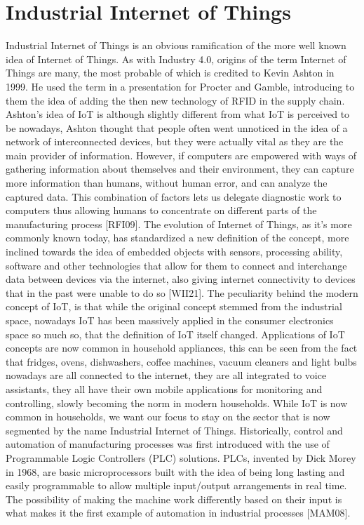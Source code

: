 \documentclass[a4paper, 12pt]{book}
\begin{document}
\section{Industrial Internet of Things}
Industrial Internet of Things is an obvious ramification of the more well known idea of Internet of Things. As with Industry 4.0, origins of the term Internet of Things are many, the most probable of which is credited to Kevin Ashton in 1999. He used the term in a presentation for Procter and Gamble, introducing to them the idea of adding the then new technology of RFID in the supply chain. Ashton’s idea of IoT is although slightly different from what IoT is perceived to be nowadays, Ashton thought that people often went unnoticed in the idea of a network of interconnected devices, but they were actually vital as they are the main provider of information. However, if computers are empowered with ways of gathering information about themselves and their environment, they can capture more information than humans, without human error, and can analyze the captured data. This combination of factors lets us delegate diagnostic work to computers thus allowing humans to concentrate on different parts of the manufacturing process [RFI09].
The evolution of Internet of Things, as it’s more commonly known today, has standardized a new definition of the concept, more inclined towards the idea of embedded objects with sensors, processing ability, software and other technologies that allow for them to connect and interchange data between devices via the internet, also giving internet connectivity to devices that in the past were unable to do so [WII21]. The peculiarity behind the modern concept of IoT, is that while the original concept stemmed from the industrial space, nowadays IoT has been massively applied in the consumer electronics space so much so, that the definition of IoT itself changed. Applications of IoT concepts are now common in household appliances, this can be seen from the fact that fridges, ovens, dishwashers, coffee machines, vacuum cleaners and light bulbs nowadays are all connected to the internet, they are all integrated to voice assistants, they all have their own mobile applications for monitoring and controlling, slowly becoming the norm in modern households.
While IoT is now common in households, we want our focus to stay on the sector that is now segmented by the name Industrial Internet of Things. Historically, control and automation of manufacturing processes was first introduced with the use of Programmable Logic Controllers (PLC) solutions. PLCs, invented by Dick Morey in 1968, are basic microprocessors built with the idea of being long lasting and easily programmable to allow multiple input/output arrangements in real time. The possibility of making the machine work differently based on their input is what makes it the first example of automation in industrial processes [MAM08].
\end{document}
